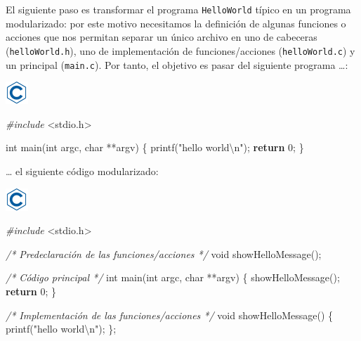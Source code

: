 \documentclass[
]{book}
\newenvironment{Shaded}{\begin{snugshade}}{\end{snugshade}}
\newcommand{\CommentTok}[1]{\textcolor[rgb]{0.56,0.35,0.01}{\textit{#1}}}
\newcommand{\ControlFlowTok}[1]{\textcolor[rgb]{0.13,0.29,0.53}{\textbf{#1}}}
\newcommand{\DataTypeTok}[1]{\textcolor[rgb]{0.13,0.29,0.53}{#1}}
\newcommand{\DecValTok}[1]{\textcolor[rgb]{0.00,0.00,0.81}{#1}}
\newcommand{\ImportTok}[1]{#1}
\newcommand{\NormalTok}[1]{#1}
\newcommand{\PreprocessorTok}[1]{\textcolor[rgb]{0.56,0.35,0.01}{\textit{#1}}}
\newcommand{\SpecialCharTok}[1]{\textcolor[rgb]{0.00,0.00,0.00}{#1}}
\newcommand{\StringTok}[1]{\textcolor[rgb]{0.31,0.60,0.02}{#1}}
\begin{document}
El siguiente paso es transformar el programa \texttt{HelloWorld} típico en un programa modularizado: por este motivo necesitamos la definición de algunas funciones o acciones que nos permitan separar un único archivo en uno de cabeceras (\texttt{helloWorld.h}), uno de implementación de funciones/acciones (\texttt{helloWorld.c}) y un principal (\texttt{main.c}). Por tanto, el objetivo es pasar del siguiente programa \ldots:

\includegraphics{./img/c.png}

\begin{Shaded}
\begin{Highlighting}[]
\PreprocessorTok{\#include }\ImportTok{\textless{}stdio.h\textgreater{}}

\DataTypeTok{int}\NormalTok{ main(}\DataTypeTok{int}\NormalTok{ argc, }\DataTypeTok{char}\NormalTok{ **argv) \{}
\NormalTok{    printf(}\StringTok{"hello world}\SpecialCharTok{\textbackslash{}n}\StringTok{"}\NormalTok{);}
    \ControlFlowTok{return} \DecValTok{0}\NormalTok{;}
\NormalTok{\}}
\end{Highlighting}
\end{Shaded}

\ldots{} el siguiente código modularizado:

\includegraphics{./img/c.png}

\begin{Shaded}
\begin{Highlighting}[]
\PreprocessorTok{\#include }\ImportTok{\textless{}stdio.h\textgreater{}}

\CommentTok{/* Predeclaración de las funciones/acciones */}
\DataTypeTok{void}\NormalTok{ showHelloMessage();}

\CommentTok{/* Código principal */}
\DataTypeTok{int}\NormalTok{ main(}\DataTypeTok{int}\NormalTok{ argc, }\DataTypeTok{char}\NormalTok{ **argv) \{}
\NormalTok{    showHelloMessage();}
    \ControlFlowTok{return} \DecValTok{0}\NormalTok{;}
\NormalTok{\}}

\CommentTok{/* Implementación de las funciones/acciones */}
\DataTypeTok{void}\NormalTok{ showHelloMessage() \{}
\NormalTok{    printf(}\StringTok{"hello world}\SpecialCharTok{\textbackslash{}n}\StringTok{"}\NormalTok{);}
\NormalTok{\};}
\end{Highlighting}
\end{Shaded}
\end{document}

